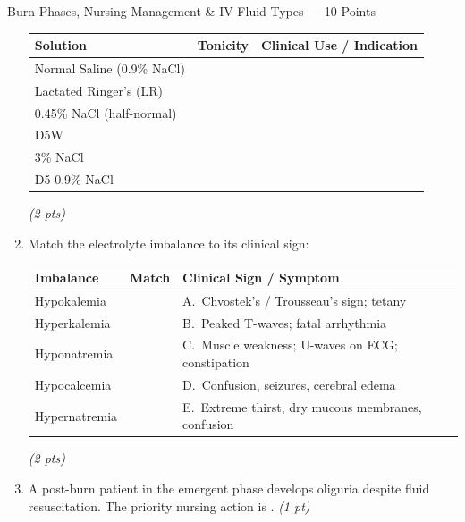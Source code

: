 \documentclass[11pt,letterpaper]{article}
\newcommand{\blank}[1][3cm]{\underline{\hspace{#1}}}
\begin{document}
\begin{diagbox}{Burn Phases, Nursing Management \& IV Fluid Types --- 10 Points}
\begin{enumerate}[leftmargin=1.5em, label=\textbf{\arabic*.},start=121]
  \vspace{0.2cm}
  \begin{center}
  \renewcommand{\arraystretch}{1.6}
  \begin{tabular}{|p{3.5cm}|p{2.5cm}|p{5cm}|}
  \hline
  \textbf{Solution} & \textbf{Tonicity} & \textbf{Clinical Use / Indication} \\
  \hline
  Normal Saline (0.9\% NaCl)   & \blank[2cm] & \blank[4.5cm] \\
  \hline
  Lactated Ringer's (LR)       & \blank[2cm] & \blank[4.5cm] \\
  \hline
  0.45\% NaCl (half-normal)    & \blank[2cm] & \blank[4.5cm] \\
  \hline
  D5W                          & \blank[2cm] & \blank[4.5cm] \\
  \hline
  3\% NaCl                     & \blank[2cm] & \blank[4.5cm] \\
  \hline
  D5 0.9\% NaCl                & \blank[2cm] & \blank[4.5cm] \\
  \hline
  \end{tabular}
  \end{center}
  \hfill\textit{(2 pts)}

  \item Match the electrolyte imbalance to its clinical sign:

  \vspace{0.2cm}
  \begin{center}
  \renewcommand{\arraystretch}{1.6}
  \begin{tabular}{|p{4cm}|p{1.5cm}|p{6cm}|}
  \hline
  \textbf{Imbalance} & \textbf{Match} & \textbf{Clinical Sign / Symptom} \\
  \hline
  Hypokalemia    & \blank[1.2cm] & A.\ Chvostek's / Trousseau's sign; tetany \\
  \hline
  Hyperkalemia   & \blank[1.2cm] & B.\ Peaked T-waves; fatal arrhythmia \\
  \hline
  Hyponatremia   & \blank[1.2cm] & C.\ Muscle weakness; U-waves on ECG; constipation \\
  \hline
  Hypocalcemia   & \blank[1.2cm] & D.\ Confusion, seizures, cerebral edema \\
  \hline
  Hypernatremia  & \blank[1.2cm] & E.\ Extreme thirst, dry mucous membranes, confusion \\
  \hline
  \end{tabular}
  \end{center}
  \hfill\textit{(2 pts)}

  \item A post-burn patient in the emergent phase develops oliguria despite fluid
        resuscitation.  The priority nursing action is \blank[5cm].
        \hfill\textit{(1 pt)}


\end{enumerate}
\end{diagbox}
\end{document}

